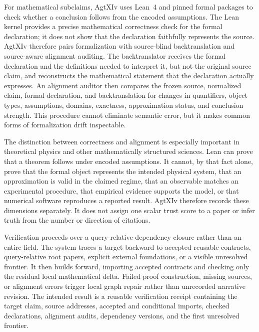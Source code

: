 For mathematical subclaims, AgtXIv uses Lean~4 and pinned formal packages to check whether a conclusion follows from the encoded assumptions. The Lean kernel provides a precise mathematical correctness check for the formal declaration; it does not show that the declaration faithfully represents the source. AgtXIv therefore pairs formalization with source-blind backtranslation and source-aware alignment auditing. The backtranslator receives the formal declaration and the definitions needed to interpret it, but not the original source claim, and reconstructs the mathematical statement that the declaration actually expresses. An alignment auditor then compares the frozen source, normalized claim, formal declaration, and backtranslation for changes in quantifiers, object types, assumptions, domains, exactness, approximation status, and conclusion strength. This procedure cannot eliminate semantic error, but it makes common forms of formalization drift inspectable.

The distinction between correctness and alignment is especially important in theoretical physics and other mathematically structured sciences. Lean can prove that a theorem follows under encoded assumptions. It cannot, by that fact alone, prove that the formal object represents the intended physical system, that an approximation is valid in the claimed regime, that an observable matches an experimental procedure, that empirical evidence supports the model, or that numerical software reproduces a reported result. AgtXIv therefore records these dimensions separately. It does not assign one scalar trust score to a paper or infer truth from the number or direction of citations.

Verification proceeds over a query-relative dependency closure rather than an entire field. The system traces a target backward to accepted reusable contracts, query-relative root papers, explicit external foundations, or a visible unresolved frontier. It then builds forward, importing accepted contracts and checking only the residual local mathematical delta. Failed proof construction, missing sources, or alignment errors trigger local graph repair rather than unrecorded narrative revision. The intended result is a reusable verification receipt containing the target claim, source addresses, accepted and conditional imports, checked declarations, alignment audits, dependency versions, and the first unresolved frontier.

